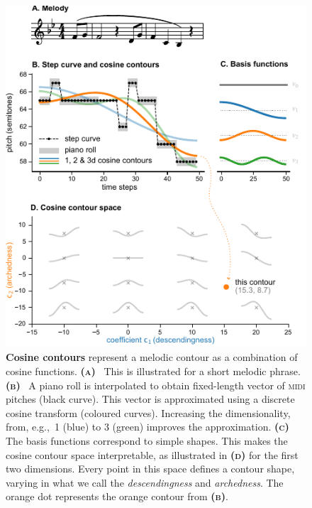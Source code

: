 \documentclass{article}
\newcommand{\subfiglabel}[1]{\textbf{\textsc{#1}}}
\begin{document}
\begin{figure}[t]
    \centering
    \includegraphics{figs/fig01-cosine-contours.pdf}
    \caption{
        \textbf{Cosine contours} represent a melodic contour as a combination of cosine functions.
        \subfiglabel{(a)}~%
        This is illustrated for a short melodic phrase.
        \subfiglabel{(b)}~%
        A piano roll is interpolated to obtain fixed-length vector of \textsc{midi} pitches (black curve).
        This vector is approximated using a discrete cosine transform (coloured curves).
        Increasing the dimensionality, from, e.g.,~1 (blue) to 3 (green) improves the approximation.
        \subfiglabel{(c)}~%
        The basis functions correspond to simple shapes.
        This makes the cosine contour space interpretable, as illustrated in \subfiglabel{(d)} for the first two dimensions. 
        Every point in this space defines a contour shape, varying in what we call the \emph{descendingness} and \emph{archedness}. 
        The orange dot represents the orange contour from \subfiglabel{(b)}.
    }
    \label{fig:representation}
\end{figure}


\end{document}
